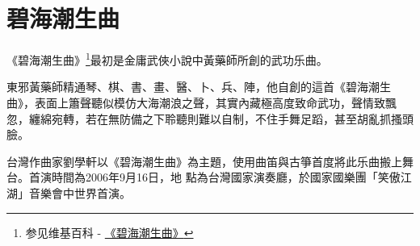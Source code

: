 \chapter{碧海潮生曲}
《碧海潮生曲》\footnote{参见维基百科 - \href{http://zh.wikipedia.org/wiki/\%E7\%A2\%A7\%E6\%B5\%B7\%E6\%BD\%AE\%E7\%94\%9F\%E6\%9B\%B2}{《碧海潮生曲》}}最初是金庸武俠小說中黃藥師所創的武功乐曲。

東邪黃藥師精通琴、棋、書、畫、醫、卜、兵、陣，他自創的這首《碧海潮生曲》，表面上簫聲聽似模仿大海潮浪之聲，其實內藏極高度致命武功，聲情致飄忽，纏綿宛轉，若在無防備之下聆聽則難以自制，不住手舞足蹈，甚至胡亂抓搔頭臉。


台灣作曲家劉學軒以《碧海潮生曲》為主題，使用曲笛與古箏首度將此乐曲搬上舞台。首演時間為2006年9月16日，地
點為台灣國家演奏廳，於國家國樂團「笑傲江湖」音樂會中世界首演。


